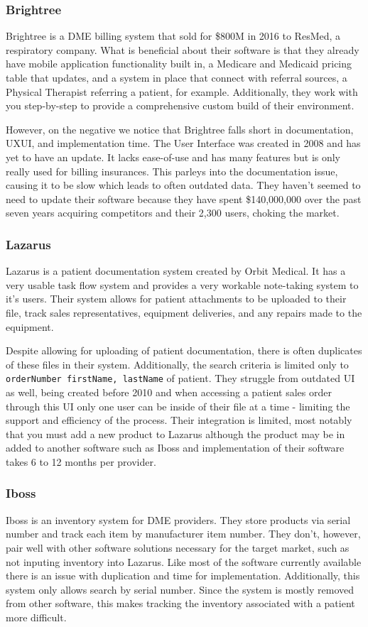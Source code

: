 \documentclass[preprint,pre,floats,aps,amsmath,amssymb]{revtex4-1}
\begin{document}
  \subsubsection{Brightree}
  Brightree is a DME billing system that sold for \$800M in 2016 to ResMed, a respiratory company. What is beneficial about their software is that they already have mobile application functionality built in, a Medicare and Medicaid pricing table that updates, and a system in place that connect with referral sources, a Physical Therapist referring a patient, for example. Additionally, they work with you step-by-step to provide a comprehensive custom build of their environment.

  However, on the negative we notice that Brightree falls short in documentation, UXUI, and implementation time. The User Interface was created in 2008 and has yet to have an update. It lacks ease-of-use and has many features but is only really used for billing insurances. This parleys into the documentation issue, causing it to be slow which leads to often outdated data. They haven’t seemed to need to update their software because they have spent \$140,000,000 over the past seven years acquiring competitors and their 2,300 users, choking the market.

  \subsubsection{Lazarus}
  Lazarus is a patient documentation system created by Orbit Medical. It has a very usable task flow system and provides a very workable note-taking system to it’s users. Their system allows for patient attachments to be uploaded to their file, track sales representatives, equipment deliveries, and any repairs made to the equipment.

  Despite allowing for uploading of patient documentation, there is often duplicates of these files in their system. Additionally, the search criteria is limited only to \texttt{orderNumber firstName, lastName} of patient. They struggle from outdated UI as well, being created before 2010 and when accessing a patient sales order through this UI only one user can be inside of their file at a time - limiting the support and efficiency of the process. Their integration is limited, most notably that you must add a new product to Lazarus although the product may be in added to another software such as Iboss and implementation of their software takes 6 to 12 months per provider.

  \subsubsection{Iboss}
  Iboss is an inventory system for DME providers. They store products via serial number and track each item by manufacturer item number. They don’t, however, pair well with other software solutions necessary for the target market, such as not inputing inventory into Lazarus. Like most of the software currently available there is an issue with duplication and time for implementation. Additionally, this system only allows search by serial number. Since the system is mostly removed from other software, this makes tracking the inventory associated with a patient more difficult.
\end{document}
